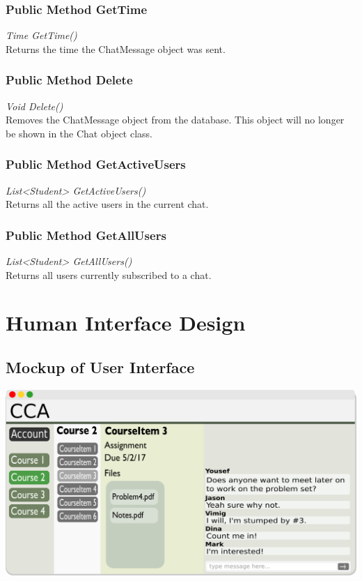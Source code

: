 \documentclass[16pt]{scrreprt}
\begin{document}
\subsection{Public Method GetTime}
\textit{Time GetTime()} \\
Returns the time the ChatMessage object was sent.

\subsection{Public Method Delete}
\textit{Void Delete()} \\
Removes the ChatMessage object from the database. This object will no longer be shown in the Chat object class.

\subsection{Public Method GetActiveUsers}
\textit{List<Student> GetActiveUsers()} \\
Returns all the active users in the current chat. 

\subsection{Public Method GetAllUsers}
\textit{List<Student> GetAllUsers()} \\
Returns all users currently subscribed to a chat. 


\chapter{Human Interface Design}

\section{Mockup of User Interface}

\includegraphics[width=1.0\textwidth]{diagrams/UI_Mockup.png}
\end{document}
